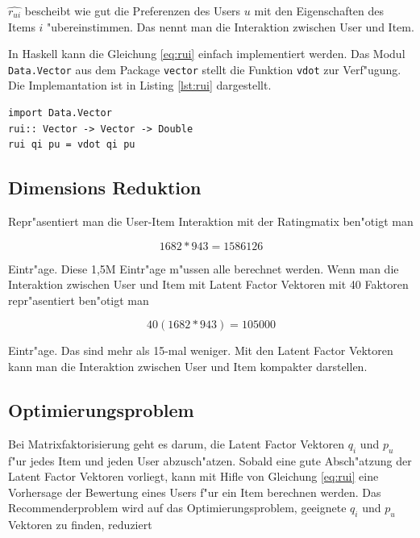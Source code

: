\documentclass[a4paper, 12pt]{article}
\begin{document}
$\hat{r_{ui}}$ bescheibt wie gut die Preferenzen des Users $u$ mit den Eigenschaften des Items $i$ "ubereinstimmen. Das nennt man die Interaktion zwischen User und Item.

In Haskell kann die Gleichung \ref{eq:rui} einfach implementiert werden. Das Modul \verb|Data.Vector| aus dem Package \verb|vector| stellt die Funktion \verb|vdot| zur Verf"ugung. Die Implemantation ist in Listing \ref{lst:rui} dargestellt.

\begin{lstlisting}[caption=Implementation der Vorhersage, label=lst:rui]
import Data.Vector
rui:: Vector -> Vector -> Double
rui qi pu = vdot qi pu
\end{lstlisting}

\subsection{Dimensions Reduktion}
\label{sec:dimred}

Repr"asentiert man die User-Item Interaktion mit der Ratingmatix ben"otigt man 

\begin{equation}
  \label{eq:dimre}
  1682 * 943 = 1586126
\end{equation}

Eintr"age. Diese 1,5M Eintr"age m"ussen alle berechnet werden. Wenn man die Interaktion zwischen User und Item mit Latent Factor Vektoren mit 40 Faktoren repr"asentiert ben"otigt man 

\begin{equation}
  \label{eq:dimred}
  40(1682*943) = 105000
\end{equation}

Eintr"age. Das sind mehr als 15-mal weniger. Mit den Latent Factor Vektoren kann man die Interaktion zwischen User und Item kompakter darstellen.

\subsection{Optimierungsproblem}
\label{sec:optim}

Bei Matrixfaktorisierung geht es darum, die Latent Factor Vektoren $q_i$ und $p_u$ f"ur jedes Item und jeden User abzusch"atzen. Sobald eine gute Absch"atzung der Latent Factor Vektoren vorliegt, kann mit Hifle von Gleichung \ref{eq:rui} eine Vorhersage der Bewertung eines Users f"ur ein Item berechnen werden. Das Recommenderproblem wird auf das Optimierungsproblem, geeignete  $q_i$ und $p_u$ Vektoren zu finden, reduziert
\end{document}
